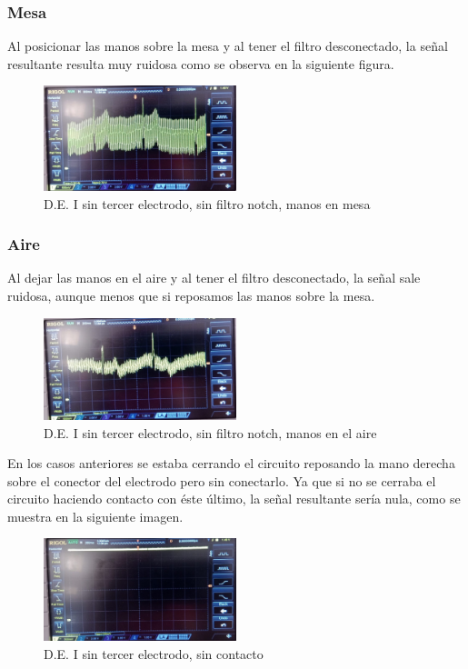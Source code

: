 \documentclass[conference]{IEEEtran}
\begin{document}
\subsubsection{Mesa}
Al posicionar las manos sobre la mesa y al tener el filtro desconectado, la señal resultante resulta muy ruidosa como se observa en la siguiente figura.
\begin{figure}[H]
    \centerline{\includegraphics[width=0.5\textwidth]{d_SINelectrodo_SINnotch_mesa.jpg}}
    \caption{D.E. I sin tercer electrodo, sin filtro notch, manos en mesa}
    \end{figure}

\subsubsection{Aire}
Al dejar las manos en el aire y al tener el filtro desconectado, la señal sale ruidosa, aunque menos que si reposamos las manos sobre la mesa.
\begin{figure}[H]
    \centerline{\includegraphics[width=0.5\textwidth]{d_SINelectrodo_SINnotch_aire.jpg}}
    \caption{D.E. I sin tercer electrodo, sin filtro notch, manos en el aire}
    \end{figure}

En los casos anteriores se estaba cerrando el circuito reposando la mano derecha sobre el conector del electrodo pero sin conectarlo. Ya que si no se cerraba el circuito haciendo contacto con éste último, la señal resultante sería nula, como se muestra en la siguiente imagen.
\begin{figure}[H]
    \centerline{\includegraphics[width=0.5\textwidth]{d_SinElectrodo_sintocar.jpg}}
    \caption{D.E. I sin tercer electrodo, sin contacto}
    \end{figure}
\end{document}
